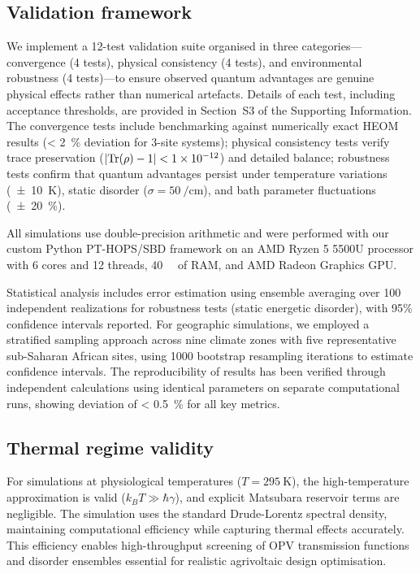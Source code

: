 \subsection{Validation framework}

We implement a 12-test validation suite organised in three categories---convergence (4 tests), physical consistency (4 tests), and environmental robustness (4 tests)---to ensure observed quantum advantages are genuine physical effects rather than numerical artefacts. Details of each test, including acceptance thresholds, are provided in Section~S3 of the Supporting Information. The convergence tests include benchmarking against numerically exact HEOM results \cite{Suess2014} (\SI{< 2}{\percent} deviation for 3-site systems); physical consistency tests verify trace preservation ($|{\rm Tr}(\rho) - 1| < \num{1e-12}$) and detailed balance; robustness tests confirm that quantum advantages persist under temperature variations (\SI{\pm 10}{\kelvin}), static disorder ($\sigma = \SI{50}{\per\cm}$), and bath parameter fluctuations (\SI{\pm 20}{\percent}).

All simulations use double-precision arithmetic and were performed with our custom Python PT-HOPS/SBD framework \cite{Citty2024a} on an AMD Ryzen 5 5500U processor with 6 cores and 12 threads, \SI{40}{\giga\byte} of RAM, and AMD Radeon Graphics GPU.

Statistical analysis includes error estimation using ensemble averaging over 100 independent realizations for robustness tests (static energetic disorder), with 95\% confidence intervals reported. For geographic simulations, we employed a stratified sampling approach across nine climate zones with five representative sub-Saharan African sites, using \num{1000} bootstrap resampling iterations to estimate confidence intervals. The reproducibility of results has been verified through independent calculations using identical parameters on separate computational runs, showing deviation of \SI{< 0.5}{\percent} for all key metrics.

\subsection{Thermal regime validity}

For simulations at physiological temperatures ($T = \SI{295}{\kelvin}$), the high-temperature approximation is valid ($k_B T \gg \hbar\gamma$), and explicit Matsubara reservoir terms are negligible. The simulation uses the standard Drude-Lorentz spectral density, maintaining computational efficiency while capturing thermal effects accurately. This efficiency enables high-throughput screening of OPV transmission functions and disorder ensembles essential for realistic agrivoltaic design optimisation.